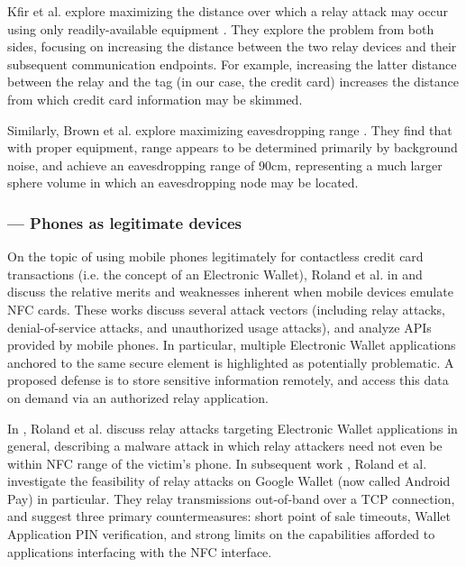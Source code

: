 Kfir et al. explore maximizing the distance over which a relay attack may occur using only readily-available equipment \cite{kfir2005picking}.
    They explore the problem from both sides, focusing on increasing the distance between the two relay devices and their subsequent communication endpoints.
For example, increasing the latter distance between the relay and the tag (in our case, the credit card)
    increases the distance from which credit card information may be skimmed.

Similarly, Brown et al. explore maximizing eavesdropping range \cite{brown2013evaluating}.
They find that with proper equipment, range appears to be determined primarily by background noise,
    and achieve an eavesdropping range of 90cm, representing a much larger sphere volume in which an eavesdropping node may be located.

\subsubsection*{--- Phones as legitimate devices}

On the topic of using mobile phones legitimately for contactless credit card transactions (i.e. the concept of an Electronic Wallet),
    Roland et al. in \cite{roland2012software} and \cite{roland2012practical} discuss the relative merits and weaknesses inherent when mobile devices emulate NFC cards.
These works discuss several attack vectors (including relay attacks, denial-of-service attacks, and unauthorized usage attacks),
    and analyze APIs provided by mobile phones.
In particular, multiple Electronic Wallet applications anchored to the same secure element is highlighted as potentially problematic.
A proposed defense is to store sensitive information remotely, and access this data on demand via an authorized relay application.

In \cite{roland2012relay}, Roland et al. discuss relay attacks targeting Electronic Wallet applications in general,
    describing a malware attack in which relay attackers need not even be within NFC range of the victim's phone.
In subsequent work \cite{roland2013applying}, Roland et al. investigate the feasibility of relay attacks on Google Wallet (now called Android Pay) in particular.
They relay transmissions out-of-band over a TCP connection, and suggest three primary countermeasures:
    short point of sale timeouts, Wallet Application PIN verification, and strong limits on the capabilities afforded to applications interfacing with the NFC interface.

